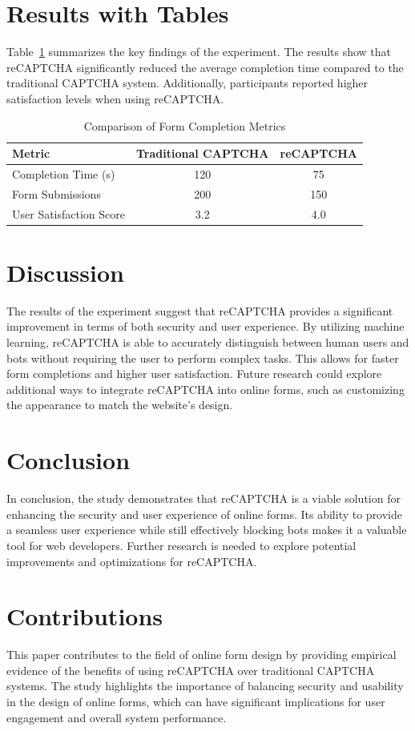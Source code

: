 \documentclass{article}
\begin{document}
\section{Results with Tables}
Table~\ref{tab:results} summarizes the key findings of the experiment. The results show that reCAPTCHA significantly reduced the average completion time compared to the traditional CAPTCHA system. Additionally, participants reported higher satisfaction levels when using reCAPTCHA.

\begin{table}[ht]
\centering
\caption{Comparison of Form Completion Metrics}
\label{tab:results}
\begin{tabular}{|l|c|c|}
\hline
\textbf{Metric} & \textbf{Traditional CAPTCHA} & \textbf{reCAPTCHA} \\
\hline
Completion Time (s) & 120 & 75 \\
\hline
Form Submissions & 200 & 150 \\
\hline
User Satisfaction Score & 3.2 & 4.0 \\
\hline
\end{tabular}
\end{table}

\section{Discussion}
The results of the experiment suggest that reCAPTCHA provides a significant improvement in terms of both security and user experience. By utilizing machine learning, reCAPTCHA is able to accurately distinguish between human users and bots without requiring the user to perform complex tasks. This allows for faster form completions and higher user satisfaction. Future research could explore additional ways to integrate reCAPTCHA into online forms, such as customizing the appearance to match the website's design.

\section{Conclusion}
In conclusion, the study demonstrates that reCAPTCHA is a viable solution for enhancing the security and user experience of online forms. Its ability to provide a seamless user experience while still effectively blocking bots makes it a valuable tool for web developers. Further research is needed to explore potential improvements and optimizations for reCAPTCHA.

\section{Contributions}
This paper contributes to the field of online form design by providing empirical evidence of the benefits of using reCAPTCHA over traditional CAPTCHA systems. The study highlights the importance of balancing security and usability in the design of online forms, which can have significant implications for user engagement and overall system performance.



\end{document}
